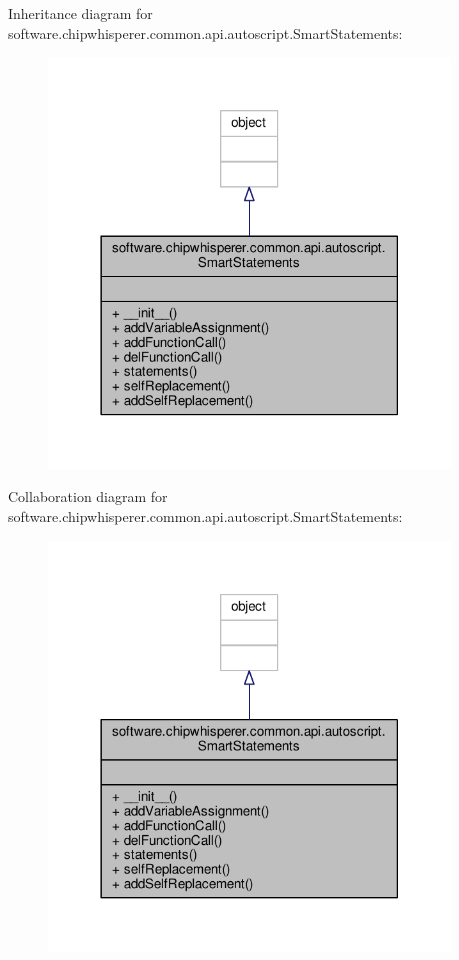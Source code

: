 Inheritance diagram for software.\+chipwhisperer.\+common.\+api.\+autoscript.\+Smart\+Statements\+:\nopagebreak
\begin{figure}[H]
\begin{center}
\leavevmode
\includegraphics[width=302pt]{df/de0/classsoftware_1_1chipwhisperer_1_1common_1_1api_1_1autoscript_1_1SmartStatements__inherit__graph}
\end{center}
\end{figure}


Collaboration diagram for software.\+chipwhisperer.\+common.\+api.\+autoscript.\+Smart\+Statements\+:\nopagebreak
\begin{figure}[H]
\begin{center}
\leavevmode
\includegraphics[width=302pt]{d0/dcb/classsoftware_1_1chipwhisperer_1_1common_1_1api_1_1autoscript_1_1SmartStatements__coll__graph}
\end{center}
\end{figure}


